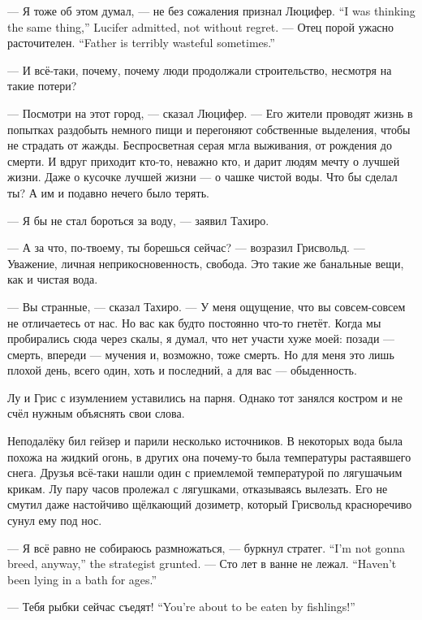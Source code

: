 {--- Я тоже об этом думал, --- не без сожаления признал Люцифер.}
{``I was thinking the same thing,'' Lucifer admitted, not without regret.}
{--- Отец порой ужасно расточителен.}
{``Father is terribly wasteful sometimes.''}

--- И всё-таки, почему, почему люди продолжали строительство, несмотря на такие потери?

--- Посмотри на этот город, --- сказал Люцифер.
--- Его жители проводят жизнь в попытках раздобыть немного пищи и перегоняют собственные выделения, чтобы не страдать от жажды.
Беспросветная серая мгла выживания, от рождения до смерти.
И вдруг приходит кто-то, неважно кто, и дарит людям мечту о лучшей жизни.
Даже о кусочке лучшей жизни --- о чашке чистой воды.
Что бы сделал ты?
А им и подавно нечего было терять.

--- Я бы не стал бороться за воду, --- заявил Тахиро.

--- А за что, по-твоему, ты борешься сейчас? --- возразил Грисвольд.
--- Уважение, личная неприкосновенность, свобода.
Это такие же банальные вещи, как и чистая вода.

--- Вы странные, --- сказал Тахиро.
--- У меня ощущение, что вы совсем-совсем не отличаетесь от нас.
Но вас как будто постоянно что-то гнетёт.
Когда мы пробирались сюда через скалы, я думал, что нет участи хуже моей: позади --- смерть, впереди --- мучения и, возможно, тоже смерть.
Но для меня это лишь плохой день, всего один, хоть и последний, а для вас --- обыденность.

Лу и Грис с изумлением уставились на парня.
Однако тот занялся костром и не счёл нужным объяснять свои слова.

\asterism

Неподалёку бил гейзер и парили несколько источников.
В некоторых вода была похожа на жидкий огонь, в других она почему-то была температуры растаявшего снега.
Друзья всё-таки нашли один с приемлемой температурой по лягушачьим крикам.
Лу пару часов пролежал с лягушками, отказываясь вылезать.
Его не смутил даже настойчиво щёлкающий дозиметр, который Грисвольд красноречиво сунул ему под нос.

{--- Я всё равно не собираюсь размножаться, --- буркнул стратег.}
{``I'm not gonna breed, anyway,'' the strategist grunted.}
{--- Сто лет в ванне не лежал.}
{``Haven't been lying in a bath for ages.''}

{--- Тебя рыбки сейчас съедят!}
{``You're about to be eaten by fishlings!''}

